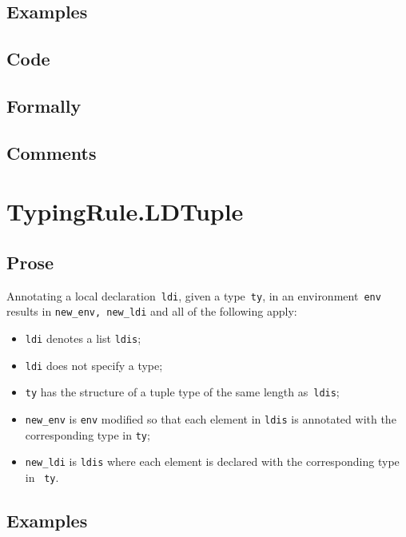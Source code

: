 \documentclass{book}
\begin{document}
  \subsection{Examples}

  \subsection{Code}

  \subsection{Formally}

  \subsection{Comments}

\section{TypingRule.LDTuple \label{sec:TypingRule.LDTuple}}

  \subsection{Prose}
    Annotating a local declaration~\texttt{ldi}, given a type~\texttt{ty}, in
an environment~\texttt{env} results in \texttt{new\_env, new\_ldi} and all of
the following apply:
  \begin{itemize}
  \item \texttt{ldi} denotes a list \texttt{ldis};
  \item \texttt{ldi} does not specify a type;
  \item \texttt{ty} has the structure of a tuple type of the same length as~\texttt{ldis};
  \item \texttt{new\_env} is \texttt{env} modified so that each element in \texttt{ldis} is annotated with the corresponding type in \texttt{ty}; 
  \item \texttt{new\_ldi} is \texttt{ldis} where each element is declared with
the corresponding type in ~\texttt{ty}.
  \end{itemize} 

  \subsection{Examples}
\end{document}
